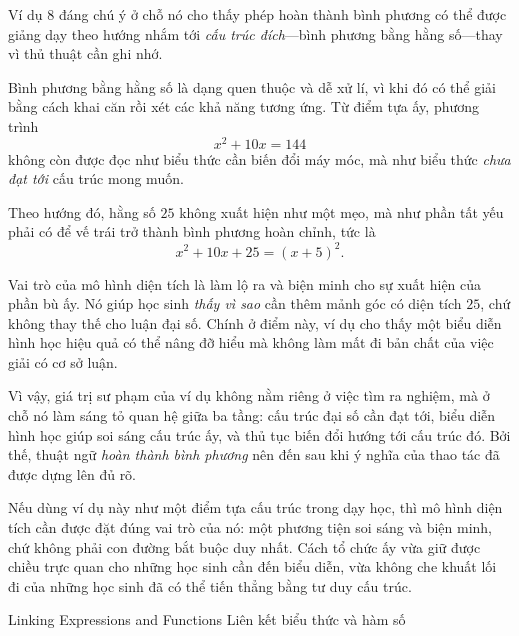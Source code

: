   {
    \vspace{.5\baselineskip}
    Ví dụ 8 đáng chú ý ở chỗ nó cho thấy phép hoàn thành bình phương có thể được giảng dạy theo hướng nhắm tới \emph{cấu trúc đích}---bình phương bằng hằng số---thay vì thủ thuật cần ghi nhớ.

    Bình phương bằng hằng số là dạng quen thuộc và dễ xử lí, vì khi đó có thể giải bằng cách khai căn rồi xét các khả năng tương ứng. Từ điểm tựa ấy, phương trình
    $$
    x^2+10x=144
    $$
    không còn được đọc như biểu thức cần biến đổi máy móc, mà như biểu thức \emph{chưa đạt tới} cấu trúc mong muốn.

    Theo hướng đó, hằng số $25$ không xuất hiện như một mẹo, mà như phần tất yếu phải có để vế trái trở thành bình phương hoàn chỉnh, tức là
    $$
    x^2+10x+25=(x+5)^2.
    $$

    Vai trò của mô hình diện tích là làm lộ ra và biện minh cho sự xuất hiện của phần bù ấy. Nó giúp học sinh \emph{thấy vì sao} cần thêm mảnh góc có diện tích $25$, chứ không thay thế cho luận đại số. Chính ở điểm này, ví dụ cho thấy một biểu diễn hình học hiệu quả có thể nâng đỡ hiểu mà không làm mất đi bản chất của việc giải có cơ sở luận.

    Vì vậy, giá trị sư phạm của ví dụ không nằm riêng ở việc tìm ra nghiệm, mà ở chỗ nó làm sáng tỏ quan hệ giữa ba tầng: cấu trúc đại số cần đạt tới, biểu diễn hình học giúp soi sáng cấu trúc ấy, và thủ tục biến đổi hướng tới cấu trúc đó. Bởi thế, thuật ngữ \emph{hoàn thành bình phương} nên đến sau khi ý nghĩa của thao tác đã được dựng lên đủ rõ.

    Nếu dùng ví dụ này như một điểm tựa cấu trúc trong dạy học, thì mô hình diện tích cần được đặt đúng vai trò của nó: một phương tiện soi sáng và biện minh, chứ không phải con đường bắt buộc duy nhất. Cách tổ chức ấy vừa giữ được chiều trực quan cho những học sinh cần đến biểu diễn, vừa không che khuất lối đi của những học sinh đã có thể tiến thẳng bằng tư duy cấu trúc.
  }

\ParallelSection
  {Linking Expressions and Functions}
  {Liên kết biểu thức và hàm số}
  {}

\TriPara
  {
  }
  {
  }{\NOTE{}}

